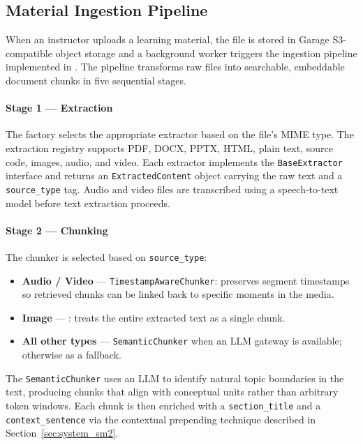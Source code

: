 \subsection{Material Ingestion Pipeline}
\label{sec:impl_ingestion}

When an instructor uploads a learning material, the file is stored in Garage S3-compatible object storage and a background worker triggers the ingestion pipeline implemented in . The pipeline transforms raw files into searchable, embeddable document chunks in five sequential stages.

\paragraph{Stage 1 — Extraction}
The  factory selects the appropriate extractor based on the file's MIME type. The extraction registry supports PDF, DOCX, PPTX, HTML, plain text, source code, images, audio, and video. Each extractor implements the \texttt{BaseExtractor} interface and returns an \texttt{ExtractedContent} object carrying the raw text and a \texttt{source\_type} tag. Audio and video files are transcribed using a speech-to-text model before text extraction proceeds.

\paragraph{Stage 2 — Chunking}
The chunker is selected based on \texttt{source\_type}:
\begin{itemize}
    \item \textbf{Audio / Video} — \texttt{TimestampAwareChunker}: preserves segment timestamps so retrieved chunks can be linked back to specific moments in the media.
    \item \textbf{Image} — : treats the entire extracted text as a single chunk.
    \item \textbf{All other types} — \texttt{SemanticChunker} when an LLM gateway is available; otherwise  as a fallback.
\end{itemize}

The \texttt{SemanticChunker} uses an LLM to identify natural topic boundaries in the text, producing chunks that align with conceptual units rather than arbitrary token windows. Each chunk is then enriched with a \texttt{section\_title} and a \texttt{context\_sentence} via the contextual prepending technique described in Section~\ref{sec:system_sm2}.

